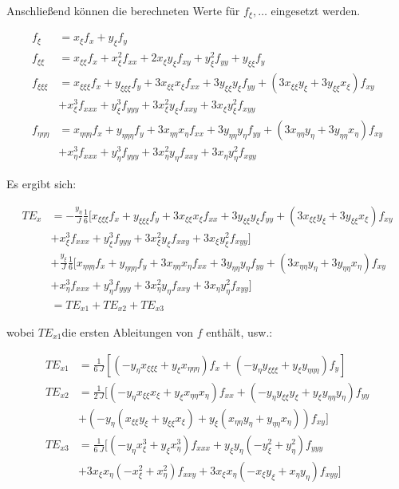 \documentclass[11pt, ngerman,colorback,accentcolor=tud2d]{tudreport}
\newcommand{\fxi}{f_{\xi}}
\newcommand{\fxxi}{f_{\xi\xi}}
\newcommand{\fxxxi}{f_{\xi\xi\xi}}
\newcommand{\xxi}{x_{\xi}}
\newcommand{\xxxi}{x_{\xi\xi}}
\newcommand{\xxxxi}{x_{\xi\xi\xi}}
\newcommand{\yxi}{y_{\xi}}
\newcommand{\yxxi}{y_{\xi\xi}}
\newcommand{\yxxxi}{y_{\xi\xi\xi}}
\newcommand{\feeeta}{f_{\eta\eta\eta}}
\newcommand{\xeta}{x_{\eta}}
\newcommand{\xeeta}{x_{\eta\eta}}
\newcommand{\xeeeta}{x_{\eta\eta\eta}}
\newcommand{\yeta}{y_{\eta}}
\newcommand{\yeeta}{y_{\eta\eta}}
\newcommand{\yeeeta}{y_{\eta\eta\eta}}
\begin{document}
Anschließend können die berechneten Werte für $f_{\xi},\dots$
eingesetzt werden.

\begin{align*}
  \fxi &= \xxi f_x + \yxi f_y\\
  \fxxi &= \xxxi f_x + \xxi^2f_{xx}+2\xxi \yxi f_{xy}
  +\yxi^2 f_{yy} + \yxxi f_y\\
  \fxxxi &= \xxxxi f_x + \yxxxi f_y + 3 \xxxi\xxi f_{xx}+
  3 \yxxi\yxi f_{yy} + \left({3\xxxi\yxi+3\yxxi\xxi}\right)f_{xy}\\
  &+ \xxi^3f_{xxx}+\yxi^3f_{yyy}+3\xxi^2\yxi f_{xxy}+3\xxi\yxi^2f_{xyy}\\
 \feeeta &= \xeeeta f_x + \yeeeta f_y + 3 \xeeta\xeta f_{xx}+
  3 \yeeta\yeta f_{yy} + \left({3\xeeta\yeta+3\yeeta\xeta}\right)f_{xy}\\
  &+ \xeta^3f_{xxx}+\yeta^3f_{yyy}+3\xeta^2\yeta f_{xxy}+3\xeta\yeta^2f_{xyy}
\end{align*}

Es ergibt sich:

\begin{align*}
  TE_x&= -\frac{y_{\eta}}{J} \frac{1}{6}\Big[\xxxxi f_x + \yxxxi f_y + 3 \xxxi\xxi f_{xx}+
  3 \yxxi\yxi f_{yy} + \left({3\xxxi\yxi+3\yxxi\xxi}\right)f_{xy}\\
&+ \xxi^3f_{xxx}+\yxi^3f_{yyy}+3\xxi^2\yxi f_{xxy}+3\xxi\yxi^2f_{xyy}\Big]\\
&+  \frac{y_{\xi}}{J}\frac{1}{6} \Big[\xeeeta f_x + \yeeeta f_y + 3 \xeeta\xeta f_{xx}+
  3 \yeeta\yeta f_{yy} + \left({3\xeeta\yeta+3\yeeta\xeta}\right)f_{xy}\\
  &+ \xeta^3f_{xxx}+\yeta^3f_{yyy}+3\xeta^2\yeta f_{xxy}+3\xeta\yeta^2f_{xyy}
\Big]\\
  &= TE_{x1} + TE_{x2} + TE_{x3}
\end{align*}

wobei $TE_{x1}$die ersten Ableitungen von $f$ enthält, usw.:

\begin{align*}
  TE_{x1} &= \frac{1}{6\ J}\left[{
  \left({-\yeta\xxxxi + \yxi\xeeeta}\right) f_x +
  \left({-\yeta\yxxxi + \yxi\yeeeta}\right) f_y
  }\right]\\
  TE_{x2} &= \frac{1}{2\ J} \Big[
  \left({-\yeta\xxxi\xxi + \yxi\xeeta\xeta}\right) f_{xx}+
  \left({-\yeta\yxxi\yxi + \yxi\yeeta\yeta}\right) f_{yy}\\&+
  \left({-\yeta \left({\xxxi\yxi+\yxxi\xxi}\right) +
  \yxi \left({\xeeta\yeta+\yeeta\xeta}\right)}\right) f_{xy}
  \Big]\\
  TE_{x3}&=\frac{1}{6\ J} \Big[
  \left({-\yeta\xxi^3+\yxi\xeta^3}\right) f_{xxx}+
  \yxi \yeta\left({-\yxi^2+\yeta^2}\right) f_{yyy}\\&+
  3 \xxi \xeta \left({-\xxi^2+\xeta^2}\right) f_{xxy}+
  3 \xxi \xeta \left({-\xxi\yxi+\xeta\yeta}\right) f_{xyy}
  \Big]
\end{align*}
\end{document}
